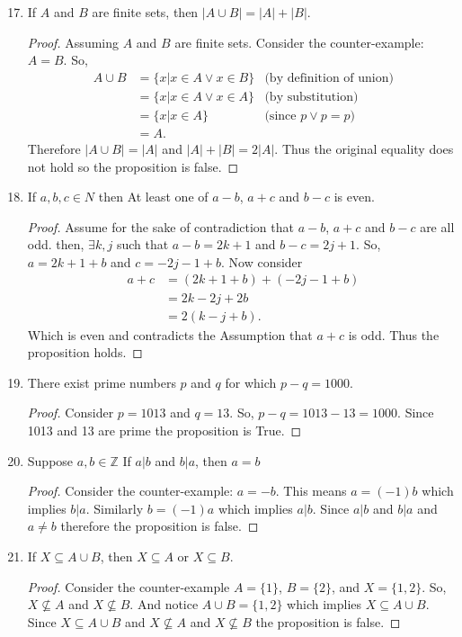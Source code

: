 \documentclass{article}
\newcommand{\Z}{\mathbb{Z}}
\newcommand{\nitem}[1] %
{
	\setcounter{enumi}{#1}
	\addtocounter{enumi}{-1}
	\item
}
\begin{document}
\begin{enumerate}
		\nitem{16} If $A$ and $B$ are finite sets, then $|A \cup B| = |A|+|B|$.
		\begin{proof}
			Assuming $A$ and $B$ are finite sets. Consider the counter-example: $A=B$. 
			So, 
			\begin{align*}
				A \cup B &= \{x| x \in A \vee x \in B \} & \text{(by definition of union)}\\
				&= \{x| x \in A \vee x \in A \} & \text{(by substitution)}\\
				&= \{x| x \in A\} 					& \text{(since } p \vee p = p) \\
				&= A.
			\end{align*}
			Therefore $|A \cup B| = |A|$ and $|A|+|B| = 2|A|$. Thus the original equality does not hold so the proposition is false.
		\end{proof}
		
		\nitem{18} If $a, b, c \in N$ then At least one of $a-b$, $a+c$ and $b-c$ is even.
		\begin{proof} 
			Assume for the sake of contradiction that $a-b$, $a+c$ and $b-c$ are all odd.
			then, $\exists k, j $ such that $a-b= 2k+1$ and $b-c= 2j+1$.
			So, $a = 2k +1+b$ and $c= -2j-1+ b$. Now consider 
			\begin{align*}
				a + c &= (2k +1+b) + (-2j-1+ b)\\
				&= 2k -2j +2b\\
				&= 2(k-j+b).
			\end{align*}
			Which is even and contradicts the Assumption that $a+c$ is odd. Thus the proposition holds.
		\end{proof}
		
		\nitem{20} There exist prime numbers $p$ and $q$ for which $p - q = 1000$.
		\begin{proof}
			Consider $p = 1013$ and $q = 13$. So, $p-q = 1013-13 = 1000$.  Since 1013 and 13 are prime the proposition is True.
		\end{proof}
		
		\nitem{28} Suppose $a,b \in \Z$ If $a|b$ and $b|a$, then $a = b$
		\begin{proof} Consider the counter-example: $a = -b$. This means $a = (-1)b$ which implies $b|a$. Similarly $b = (-1)a$ which implies $a|b$. Since $a|b$ and $b|a$ and $a \neq b$ therefore the proposition is false.
			
		\end{proof}
		
		\nitem{34} If $X \subseteq A \cup B$, then $X \subseteq A$ or $X \subseteq B$.
		\begin{proof}
			Consider the counter-example $A =\{1\}$, $B =\{2\}$, and $X=\{1, 2\}$. 
			So, $X \not\subseteq A$ and $X \not\subseteq B$.
			And notice $A \cup B = \{1, 2\}$ which implies $X \subseteq A \cup B$.
			Since $X \subseteq A \cup B$ and $X \not\subseteq A$ and $X \not\subseteq B$ the proposition is false. 
		\end{proof}
		
	\end{enumerate}
	
\end{document}
